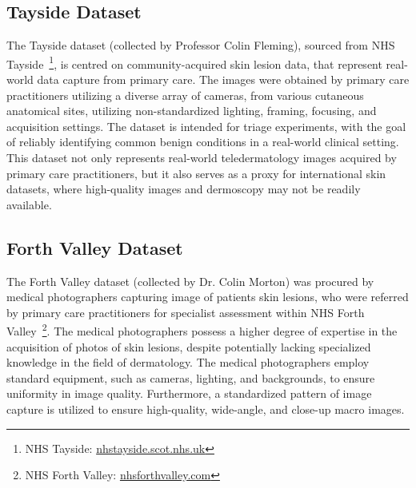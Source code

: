 \subsection{Tayside Dataset}
\label{subsec:tayside_dataset}
The Tayside dataset (collected by Professor Colin Fleming), sourced from NHS Tayside~\footnote{NHS Tayside: \url{nhstayside.scot.nhs.uk}}, is centred on community-acquired skin lesion data, that represent real-world data capture from primary care. The images were obtained by primary care practitioners utilizing a diverse array of cameras, from various cutaneous anatomical sites, utilizing non-standardized lighting, framing, focusing, and acquisition settings. The dataset is intended for triage experiments, with the goal of reliably identifying common benign conditions in a real-world clinical setting. This dataset not only represents real-world teledermatology images acquired by primary care practitioners, but it also serves as a proxy for international skin datasets, where high-quality images and dermoscopy may not be readily available.

\subsection{Forth Valley Dataset}
\label{subsec:forth_valley_dataset}
The Forth Valley dataset (collected by Dr. Colin Morton) was procured by medical photographers capturing image of patients skin lesions, who were referred by primary care practitioners for specialist assessment within NHS Forth Valley~\footnote{NHS Forth Valley: \url{nhsforthvalley.com}}. The medical photographers possess a higher degree of expertise in the acquisition of photos of skin lesions, despite potentially lacking specialized knowledge in the field of dermatology. The medical photographers employ standard equipment, such as cameras, lighting, and backgrounds, to ensure uniformity in image quality. Furthermore, a standardized pattern of image capture is utilized to ensure high-quality, wide-angle, and close-up macro images.

